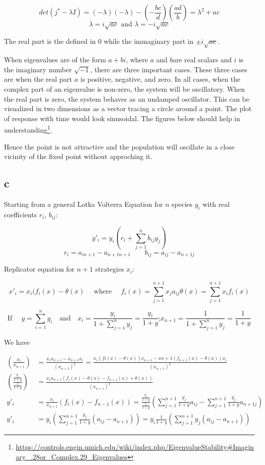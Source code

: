 \[ det(j^*-\lambda I) = (-\lambda)(-\lambda) - (-\frac{bc}{d})(\frac{ad}{b}) = \lambda^2 +ac \]
\[ \lambda = i\sqrt{ac} \text{ and } \lambda = -i\sqrt{ac} \]

The real part is the defined in $0$ while the immaginary part in $\pm i \sqrt{ac}$.

When eigenvalues are of the form $a + bi$, where $a$ and $b$are real scalars and $i$ is the imaginary number $\sqrt{-1}$, there are three important cases. These three cases are when the real part $a$ is positive, negative, and zero. In all cases, when the complex part of an eigenvalue is non-zero, the system will be oscillatory. When the real part is zero, the system behaves as an undamped oscillator. This can be visualized in two dimensions as a vector tracing a circle around a point. The plot of response with time would look sinusoidal. The figures below should help in understanding\footnote{\url{https://controls.engin.umich.edu/wiki/index.php/EigenvalueStability\#Imaginary_.28or_Complex.29_Eigenvalues}}.

Hence the point is not attractive and the population will oscillate in a close vicinity of the fixed point without approching it. 

\subsection{c}

Starting from a general Lotka Volterra Equation for $n$ species $y_i$ with real coefficients $r_i$, $b_{ij}$:

\[  y'_i  = y_i(r_{i}+\sum\limits_{j=1}^{n} b_{ij}y_j)  \]
\[ r_i = a_{in+1} - a_{n+1n+1} \text{~~~~~~} b_{ij} = a_{ij} - a_{n+1j} \]


Replicator equation for $n+1$ strategies $x_i$:

\[ x'_i = x_i(f_i(x) - \theta (x) \text{~~~~where~~~~} f_i(x) = \sum\limits_{j=1}^{n+1} x_ja_{ij} \theta(x) = \sum\limits_{j=1}^{n+1} x_if_i(x)\]

\[ \text{If~~~~} y = \sum\limits_{i=1}^{n} y_i \text{~~~and~~~} x_i = \frac{y_i}{1+\sum\limits_{j=1}^{n} y_j} = \frac{y_i}{1+y} \text{;} x_{n+1} = \frac{1}{1+\sum\limits_{j=1}^{n}y_j} = \frac{1}{1+y}\]

We have

\begin{align*}
(\frac{x_i}{x_{n+1}}) &= \frac{x_ix_{n+1}-x_{n+1}x_i}{(x_{n+1})^2} = \frac{x_i(fi(x)-\theta(x))x_{n+1} -x{x+1}(f_{n+1}(x)-\theta(x))x_i}{(x_{n+1})^2}\\
\left(\frac{\frac{y_i}{1+y}}{\frac{1}{1+y}}\right) &= \frac{x_ix_{n+1}(f_i(x)-\theta(x)-f_{n+1}(x)+\theta(x))}{(x_{n+1})^2}\\
y'_i &= \frac{x_i}{x_{n+1}}(f_i(x)-f_{n-1}(x)) = \frac{\frac{y_i}{1+y}}{\frac{1}{1+y}}\left(\sum\limits_{j=1}^{n+1}\frac{y_j}{1+y}a_{ij} - \sum\limits_{j=1}^{n+1}\frac{y_j}{1+y}a_{n+1j}\right)\\
y'_i &= y_i \left( \sum\limits_{j=1}^{n+1}\frac{y_j}{1+y}(a_{ij}-a_{n+1}) \right) = y_i\frac{1}{1+y} \left( \sum\limits_{j=1}^{n+1} {y_j}(a_{ij}-a_{n+1}) \right)
\end{align*}

